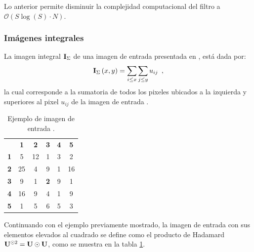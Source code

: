 Lo anterior permite disminuir la complejidad computacional del filtro a $\mathcal{O}(S\log(S) \cdot N)$.
 
\subsubsection{Imágenes integrales}


La imagen integral $\mathbf{I}_{\Sigma}$ de una imagen de entrada  presentada en \cite{viola2001robust}, está dada por: 
\begin{equation}
\mathbf{I}_{\Sigma}\left(x,y\right)=\sum_{i\leq x}\sum_{j\leq y}u_{ij} \enspace ,
\end{equation}
la cual corresponde a la sumatoria de todos los  pixeles ubicados a la izquierda y superiores al pixel $u_{ij}$ de la imagen de entrada .

\begin{table}
\begin{center}
\caption{Ejemplo de imagen de entrada .\label{table:imageExample2}}

\renewcommand{\arraystretch}{1.4}
\setlength\tabcolsep{3pt}

{
\begin{tabular}{cc|ccc|c}
 & \multicolumn{1}{c}{\textbf{1}} & \textbf{2} & \textbf{3} & \multicolumn{1}{c}{\textbf{4}} & \textbf{5}\tabularnewline
\textbf{1} & \multicolumn{1}{c}{5} & 12 & 1 & \multicolumn{1}{c}{3} & 2\tabularnewline
\cline{3-5} 
\textbf{2} & 25 & 4 & 9 & 1 & 16\tabularnewline
\textbf{3} & 9 & 1 & \textbf{2} & 9 & 1\tabularnewline
\textbf{4} & 16 & 9 & 4 & 1 & 9\tabularnewline
\cline{3-5} 
\textbf{5} & \multicolumn{1}{c}{1} & 5 & 6 & \multicolumn{1}{c}{5} & 3\tabularnewline
\end{tabular}
}
\par\end{center} 
\end{table}


Continuando con el ejemplo previamente mostrado, la imagen de entrada  con sus elementos elevados al cuadrado se define como el producto de Hadamard $\mathbf{U}^{\odot 2} = \mathbf{U} \odot \mathbf{U}$, como se muestra en la tabla \ref{table:imageExample2}. 


